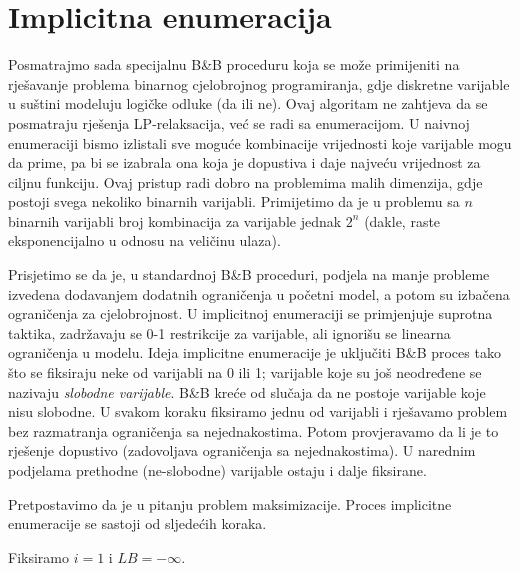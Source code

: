 \documentclass[a4paper, utf8, 11pt, colorlinks]{book}
\begin{document}
\section{Implicitna enumeracija}
Posmatrajmo sada specijalnu B\&B proceduru koja se može primijeniti na rješavanje problema binarnog cjelobrojnog programiranja, gdje diskretne varijable u suštini modeluju logičke odluke (da ili ne). Ovaj algoritam ne zahtjeva da se posmatraju rješenja LP-relaksacija, već se radi sa enumeracijom. U naivnoj enumeraciji bismo izlistali sve moguće kombinacije vrijednosti koje varijable mogu da prime, pa bi se izabrala ona koja je dopustiva i daje najveću vrijednost za ciljnu funkciju. Ovaj pristup radi dobro na problemima malih dimenzija, gdje postoji svega nekoliko binarnih varijabli. Primijetimo da je u problemu sa $n$ binarnih varijabli broj kombinacija za varijable jednak $2^n$ (dakle, raste eksponencijalno u odnosu na veličinu ulaza). 

Prisjetimo se da je, u standardnoj B\&B proceduri, podjela na manje probleme izvedena dodavanjem dodatnih ograničenja u početni model, a potom su izbačena ograničenja za cjelobrojnost. 
U implicitnoj enumeraciji se primjenjuje suprotna taktika, zadržavaju se 0-1 restrikcije za varijable, ali ignorišu se linearna ograničenja u modelu. 
Ideja implicitne enumeracije je uključiti B\&B proces tako što se fiksiraju neke od varijabli na 0 ili 1; varijable koje su još neodređene se nazivaju \emph{slobodne varijable}.  B\&B kreće od slučaja da ne postoje varijable koje nisu slobodne. U svakom koraku fiksiramo jednu od varijabli i rješavamo problem bez razmatranja ograničenja sa nejednakostima. Potom provjeravamo da li je to rješenje dopustivo (zadovoljava ograničenja sa nejednakostima). U narednim podjelama  prethodne (ne-slobodne) varijable ostaju i dalje fiksirane. 


Pretpostavimo da je u pitanju problem maksimizacije. Proces implicitne enumeracije se sastoji od sljedećih koraka. 

Fiksiramo $i=1$ i $LB=-\infty$. 
\end{document}
